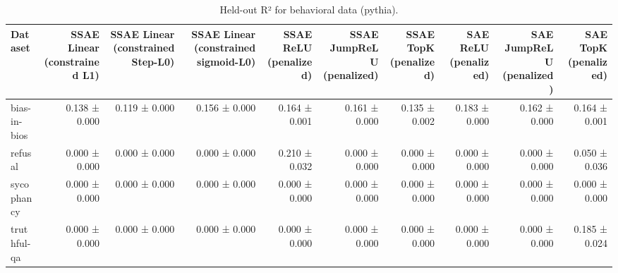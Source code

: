 \begin{table}[t]
\centering
\caption{Held-out R² for behavioral data (pythia).}
\label{tab:behavioral-pythia-r2}
\begin{tabular}{lrrrrrrrrr}
\toprule
Dataset & SSAE Linear (constrained L1) & SSAE Linear (constrained Step-L0) & SSAE Linear (constrained sigmoid-L0) & SSAE ReLU (penalized) & SSAE JumpReLU (penalized) & SSAE TopK (penalized) & SAE ReLU (penalized) & SAE JumpReLU (penalized) & SAE TopK (penalized) \\
\midrule
bias-in-bios & 0.138 ± 0.000 & 0.119 ± 0.000 & 0.156 ± 0.000 & 0.164 ± 0.001 & 0.161 ± 0.000 & 0.135 ± 0.002 & 0.183 ± 0.000 & 0.162 ± 0.000 & 0.164 ± 0.001 \\
refusal & 0.000 ± 0.000 & 0.000 ± 0.000 & 0.000 ± 0.000 & 0.210 ± 0.032 & 0.000 ± 0.000 & 0.000 ± 0.000 & 0.000 ± 0.000 & 0.000 ± 0.000 & 0.050 ± 0.036 \\
sycophancy & 0.000 ± 0.000 & 0.000 ± 0.000 & 0.000 ± 0.000 & 0.000 ± 0.000 & 0.000 ± 0.000 & 0.000 ± 0.000 & 0.000 ± 0.000 & 0.000 ± 0.000 & 0.000 ± 0.000 \\
truthful-qa & 0.000 ± 0.000 & 0.000 ± 0.000 & 0.000 ± 0.000 & 0.000 ± 0.000 & 0.000 ± 0.000 & 0.000 ± 0.000 & 0.000 ± 0.000 & 0.000 ± 0.000 & 0.185 ± 0.024 \\
\bottomrule
\end{tabular}
\end{table}
